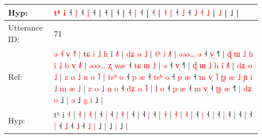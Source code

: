 \documentclass[10pt]{article}
\DeclareRobustCommand{\hl}[1]{{\textcolor{red}{#1}}}
\begin{document}
\begin{longtable}{ll}
 \\
Hyp: & \hl{}\hl{}\hl{}\hl{}\hl{t}\hl{ʰ} \hl{i} ˧ \hl{}\hl{|} ˧\hl{}\hl{}\hl{}\hl{} \hl{|} ˧ |\hl{}\hl{}\hl{}\hl{}\hl{}\hl{}\hl{}\hl{}\hl{}\hl{}\hl{} ˧ |\hl{}\hl{}\hl{}\hl{}\hl{}\hl{}\hl{}\hl{} ˧\hl{}\hl{}\hl{}\hl{}\hl{}\hl{}\hl{}\hl{}\hl{}\hl{}\hl{}\hl{}\hl{}\hl{}\hl{}\hl{}\hl{}\hl{}\hl{}\hl{}\hl{}\hl{}\hl{}\hl{}\hl{} |\hl{}\hl{} ˧ \hl{}\hl{|} ˧\hl{} |\hl{}\hl{}\hl{}\hl{}\hl{}\hl{}\hl{}\hl{}\hl{}\hl{}\hl{}\hl{}\hl{}\hl{}\hl{}\hl{}\hl{} \hl{˧} | \hl{}\hl{}\hl{˧} \hl{|} ˧\hl{}\hl{} \hl{˩} ˧ \hl{˩} \hl{˧} \hl{˩} |\hl{}\hl{}\hl{}\hl{} \hl{}\hl{˩} |\hl{}\hl{}\hl{}\hl{}\hl{} ˩ |
 \\
\midrule
Utterance ID: & 71 \\
Ref: & \hl{ə}\hl{ }\hl{˧}\hl{ }\hl{v}\hl{̩}\hl{ }\hl{˧}\hl{˥}\hl{ }\hl{|}\hl{ }t\hl{ɕ}\hl{ }\hl{i}\hl{ }\hl{˩}\hl{ }\hl{h} i\hl{̃} \hl{˩}\hl{˥} |\hl{ }\hl{d}\hl{ʑ}\hl{ }\hl{o} \hl{˩} |\hl{ }\hl{t}\hl{ʰ}\hl{ }\hl{i} \hl{˩}\hl{˥} |\hl{ }\hl{ə}\hl{ə}\hl{ə}\hl{…}\hl{ }\hl{ə} ˧ \hl{v}\hl{̩} ˧\hl{˥} |\hl{ }\hl{ɖ}\hl{ }\hl{ɯ}\hl{ }\hl{˩}\hl{ }\hl{h}\hl{ }\hl{i}\hl{̃}\hl{ }\hl{˩}\hl{ }\hl{b}\hl{ }\hl{v}\hl{̩} \hl{˩}\hl{˥} |\hl{ }\hl{ə}\hl{ə}\hl{ə}\hl{…}\hl{ }\hl{ʐ}\hl{ }\hl{w}\hl{æ} ˧\hl{ }\hl{t}\hl{ɕ}\hl{ }\hl{ɯ}\hl{ }\hl{˩} |\hl{ }\hl{ə} ˧ \hl{v}\hl{̩} ˧\hl{˥} |\hl{ }\hl{ɖ}\hl{ }\hl{ɯ}\hl{ }\hl{˩}\hl{ }\hl{h}\hl{ }\hl{i}\hl{̃} \hl{˩}\hl{˥} |\hl{ }\hl{d}\hl{ʑ}\hl{ }\hl{o} \hl{˩} |\hl{ }\hl{z}\hl{ }\hl{o}\hl{ }\hl{˩}\hl{ }\hl{n}\hl{ }\hl{o} \hl{˥} |\hl{ }\hl{t}\hl{s}\hl{ʰ}\hl{ }\hl{o} ˧\hl{ }\hl{p} \hl{æ} ˧\hl{ }\hl{t}\hl{s}\hl{ʰ} \hl{o} ˧\hl{ }\hl{p} \hl{æ} ˧\hl{ }\hl{m}\hl{ }\hl{v}\hl{̩}\hl{ }\hl{˥}\hl{ }\hl{ʈ}\hl{ʂ}\hl{ }\hl{æ}\hl{ }\hl{˩}\hl{ }\hl{ɲ}\hl{ }\hl{i}\hl{ }\hl{˩}\hl{ }\hl{m}\hl{ }\hl{æ}\hl{ }\hl{˩} |\hl{ }\hl{z}\hl{ }\hl{o}\hl{ }\hl{˩}\hl{ }\hl{n}\hl{ }\hl{o} ˧\hl{ }\hl{d}\hl{ʑ}\hl{ }\hl{o}\hl{ }\hl{˥} |\hl{ }\hl{l}\hl{ }\hl{o} ˧\hl{ }\hl{p} \hl{æ} ˧\hl{ }\hl{m} \hl{v}\hl{̩} ˧\hl{ }\hl{ʈ}\hl{ʂ} \hl{æ} ˧\hl{˥}\hl{ }\hl{|} \hl{d}\hl{ʑ} \hl{o} ˩ |\hl{ }\hl{ə} ˩\hl{ }\hl{g} \hl{i} ˩ |
 \\
Hyp: & \hl{}\hl{}\hl{}\hl{}\hl{}\hl{}\hl{}\hl{}\hl{}\hl{}\hl{}\hl{}t\hl{}\hl{}\hl{}\hl{}\hl{}\hl{}\hl{ʰ} i\hl{} \hl{}\hl{˧} |\hl{}\hl{}\hl{}\hl{}\hl{} \hl{˧} |\hl{}\hl{}\hl{}\hl{}\hl{} \hl{}\hl{˧} |\hl{}\hl{}\hl{}\hl{}\hl{}\hl{}\hl{} ˧ \hl{}\hl{|} ˧\hl{} |\hl{}\hl{}\hl{}\hl{}\hl{}\hl{}\hl{}\hl{}\hl{}\hl{}\hl{}\hl{}\hl{}\hl{}\hl{}\hl{}\hl{}\hl{} \hl{}\hl{˧} |\hl{}\hl{}\hl{}\hl{}\hl{}\hl{}\hl{}\hl{}\hl{}\hl{} ˧\hl{}\hl{}\hl{}\hl{}\hl{}\hl{}\hl{} |\hl{}\hl{} ˧ \hl{}\hl{|} ˧\hl{} |\hl{}\hl{}\hl{}\hl{}\hl{}\hl{}\hl{}\hl{}\hl{}\hl{}\hl{} \hl{}\hl{˧} |\hl{}\hl{}\hl{}\hl{}\hl{} \hl{˧} |\hl{}\hl{}\hl{}\hl{}\hl{}\hl{}\hl{}\hl{}\hl{}\hl{} \hl{˧} |\hl{}\hl{}\hl{}\hl{}\hl{}\hl{} ˧\hl{}\hl{} \hl{|} ˧\hl{}\hl{}\hl{}\hl{} \hl{|} ˧\hl{}\hl{} \hl{|} ˧\hl{}\hl{}\hl{}\hl{}\hl{}\hl{}\hl{}\hl{}\hl{}\hl{}\hl{}\hl{}\hl{}\hl{}\hl{}\hl{}\hl{}\hl{}\hl{}\hl{}\hl{}\hl{}\hl{}\hl{}\hl{}\hl{} |\hl{}\hl{}\hl{}\hl{}\hl{}\hl{}\hl{}\hl{}\hl{}\hl{} ˧\hl{}\hl{}\hl{}\hl{}\hl{}\hl{}\hl{} |\hl{}\hl{}\hl{}\hl{} ˧\hl{}\hl{} \hl{|} ˧\hl{}\hl{} \hl{}\hl{˩} ˧\hl{}\hl{}\hl{} \hl{˩} ˧\hl{}\hl{}\hl{} \hl{}\hl{˩} \hl{|} ˩ |\hl{}\hl{} ˩\hl{}\hl{} \hl{|} ˩ |

\end{longtable}
\end{document}
